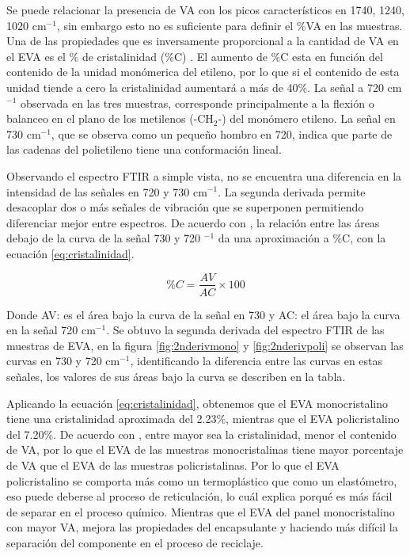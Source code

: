 Se puede relacionar la presencia de VA con los picos característicos en 1740, 1240, 1020 cm$^{-1}$, sin embargo esto no es suficiente para definir el \%VA en las muestras. Una de las propiedades que es inversamente proporcional a la cantidad de VA en el EVA es el \% de cristalinidad (\%C) \citep{Ramirez2019,Henderson1993}. El aumento de \%C esta en función del contenido de la unidad monómerica del etileno, por lo que si el contenido de esta unidad tiende a cero la cristalinidad aumentará a más de 40\%. La señal a 720 cm$^{-1}$ observada en las tres muestras, corresponde principalmente a la flexión o balanceo en el plano de los metilenos (-CH$_{2}$-) del monómero etileno. La señal en 730 cm$^{-1}$, que se observa como un pequeño hombro en 720, indica que parte de las cadenas del polietileno tiene una conformación lineal. 

Observando el espectro FTIR a simple vista, no se encuentra una diferencia en la intensidad de las señales en 720 y 730 cm$^{-1}$. La segunda derivada permite desacoplar dos o más señales de vibración que se superponen permitiendo diferenciar mejor entre espectros. De acuerdo con \citet{Ramirez2019}, la relación entre las áreas debajo de la curva de la señal 730 y 720 $^{-1}$ da una aproximación a \%C, con la ecuación \ref{eq:cristalinidad}. 

\begin{equation}
\label{eq:cristalinidad}
    \%C =\frac{AV}{AC} \times 100
\end{equation}

Donde AV: es el área bajo la curva de la señal en 730 y AC: el área bajo la curva en la señal 720 cm$^{-1}$. Se obtuvo la segunda derivada del espectro FTIR de las muestras de EVA, en la figura \ref{fig:2nderivmono} y \ref{fig:2nderivpoli} se observan las curvas en 730 y 720 cm$^{-1}$, identificando la diferencia entre las curvas en estas señales, los valores de sus áreas bajo la curva se describen en la tabla.

Aplicando la ecuación \ref{eq:cristalinidad}, obtenemos que el EVA monocristalino tiene una cristalinidad aproximada del 2.23\%, mientras que el EVA policristalino del 7.20\%. De acuerdo con \citet{Henderson1993}, entre mayor sea la cristalinidad, menor el contenido de VA, por lo que el EVA de las muestras monocristalinas tiene mayor porcentaje de VA que el EVA de las muestras policristalinas. Por lo que el EVA policristalino se comporta más como un termoplástico que como un elastómetro, eso puede deberse al proceso de reticulación, lo cuál explica porqué es más fácil de separar en el proceso químico. Mientras que el EVA del panel monocristalino con mayor VA, mejora las propiedades del encapsulante y haciendo más difícil la separación del componente en el proceso de reciclaje.

